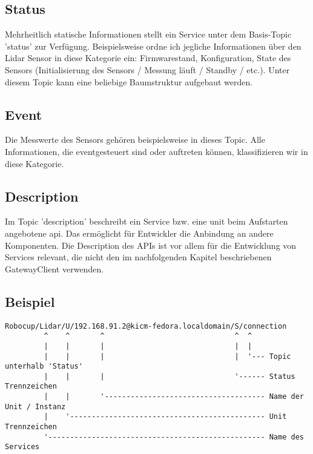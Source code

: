 \subsection{Status}
Mehrheitlich statische Informationen stellt ein Service unter dem Basis-Topic '\gls{status}' zur Verfügung. Beispielsweise ordne ich jegliche Informationen über den Lidar Sensor in diese Kategorie ein: Firmwarestand, Konfiguration, State des Sensors (Initialisierung des Sensors / Messung läuft / Standby / etc.). Unter diesem Topic kann eine beliebige Baumstruktur aufgebaut werden.
\subsection{Event}
Die Messwerte des Sensors gehören beispielsweise in dieses Topic. Alle Informationen, die eventgesteuert sind oder auftreten können, klassifizieren wir in diese Kategorie.
\subsection{Description}
Im Topic '\gls{description}' beschreibt ein Service bzw. eine \acrshort{unit} beim Aufstarten angebotene \acrshort{api}. Das ermöglicht für Entwickler die Anbindung an andere Komponenten. Die Description des APIs ist vor allem für die Entwicklung von Services relevant, die nicht den im nachfolgenden Kapitel beschriebenen GatewayClient verwenden.
\subsection{Beispiel}

\begin{verbatim}
Robocup/Lidar/U/192.168.91.2@kicm-fedora.localdomain/S/connection
         ^    ^       ^                              ^  ^
         |    |       |                              |  |
         |    |       |                              |  '--- Topic unterhalb 'Status'
         |    |       |                              '------ Status Trennzeichen
         |    |       '------------------------------------- Name der Unit / Instanz
         |    '--------------------------------------------- Unit Trennzeichen
         '-------------------------------------------------- Name des Services
\end{verbatim}

